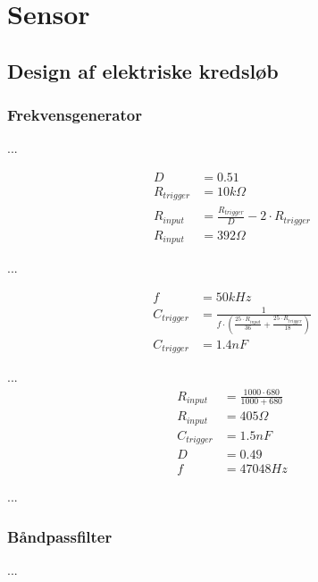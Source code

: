 \chapter{Sensor}\label{kap:chap_sensor}

\section{Design af elektriske kredsløb}
\subsection{Frekvensgenerator}
...

\begin{equation}
\label{eq:InputsModstand}
\begin{split}
D & = 0.51\\
R_{trigger} & = 10k \Omega \\
R_{input} & = \frac{R_{trigger}}{D} - 2 \cdot R_{trigger} \\
R_{input} & = 392 \Omega 
\end{split}
\end{equation}

... 

\begin{equation}
\label{eq:TriggerKondensator}
\begin{split}
f & = 50kHz \\
C_{trigger} & = \frac{1}{f \cdot \left( \frac{25 \cdot R_{input} }{36} + \frac{25 \cdot R_{trigger}}{18} \right) }\\
C_{trigger} & = 1.4nF
\end{split}
\end{equation}

...
\begin{equation}
\label{eq:TimerTilnaermedeVaerdier}
\begin{split}
R_{input} & = \frac{1000 \cdot 680}{1000+680} \\
R_{input} & = 405 \Omega \\
C_{trigger} & = 1.5nF \\
D & = 0.49 \\
f & = 47048Hz
\end{split}
\end{equation}

...

\subsection{Båndpassfilter}
...

